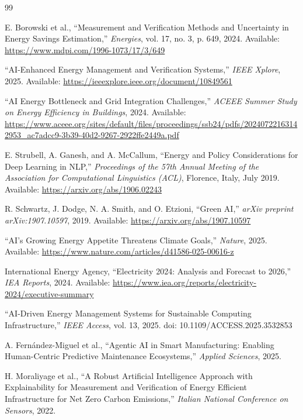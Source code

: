 \documentclass[11pt,a4paper]{article}
\begin{document}
\begin{thebibliography}{99}

E. Borowski et al.,
``Measurement and Verification Methods and Uncertainty in Energy Savings Estimation,''
\textit{Energies}, vol. 17, no. 3, p. 649, 2024.
Available: \url{https://www.mdpi.com/1996-1073/17/3/649}

``AI-Enhanced Energy Management and Verification Systems,''
\textit{IEEE Xplore}, 2025.
Available: \url{https://ieeexplore.ieee.org/document/10849561}

``AI Energy Bottleneck and Grid Integration Challenges,''
\textit{ACEEE Summer Study on Energy Efficiency in Buildings}, 2024.
Available: \url{https://www.aceee.org/sites/default/files/proceedings/ssb24/pdfs/20240722163142953_ac7adcc9-3b39-40d2-9267-2922ffe2449a.pdf}

E. Strubell, A. Ganesh, and A. McCallum,
``Energy and Policy Considerations for Deep Learning in NLP,''
\textit{Proceedings of the 57th Annual Meeting of the Association for Computational Linguistics (ACL)}, Florence, Italy, July 2019.
Available: \url{https://arxiv.org/abs/1906.02243}

R. Schwartz, J. Dodge, N. A. Smith, and O. Etzioni,
``Green AI,''
\textit{arXiv preprint arXiv:1907.10597}, 2019.
Available: \url{https://arxiv.org/abs/1907.10597}

``AI's Growing Energy Appetite Threatens Climate Goals,''
\textit{Nature}, 2025.
Available: \url{https://www.nature.com/articles/d41586-025-00616-z}

International Energy Agency,
``Electricity 2024: Analysis and Forecast to 2026,''
\textit{IEA Reports}, 2024.
Available: \url{https://www.iea.org/reports/electricity-2024/executive-summary}

``AI-Driven Energy Management Systems for Sustainable Computing Infrastructure,''
\textit{IEEE Access}, vol. 13, 2025.
doi: 10.1109/ACCESS.2025.3532853

A. Fernández-Miguel et al.,
``Agentic AI in Smart Manufacturing: Enabling Human-Centric Predictive Maintenance Ecosystems,''
\textit{Applied Sciences}, 2025.

H. Moraliyage et al.,
``A Robust Artificial Intelligence Approach with Explainability for Measurement and Verification of Energy Efficient Infrastructure for Net Zero Carbon Emissions,''
\textit{Italian National Conference on Sensors}, 2022.


\end{thebibliography}
\end{document}

